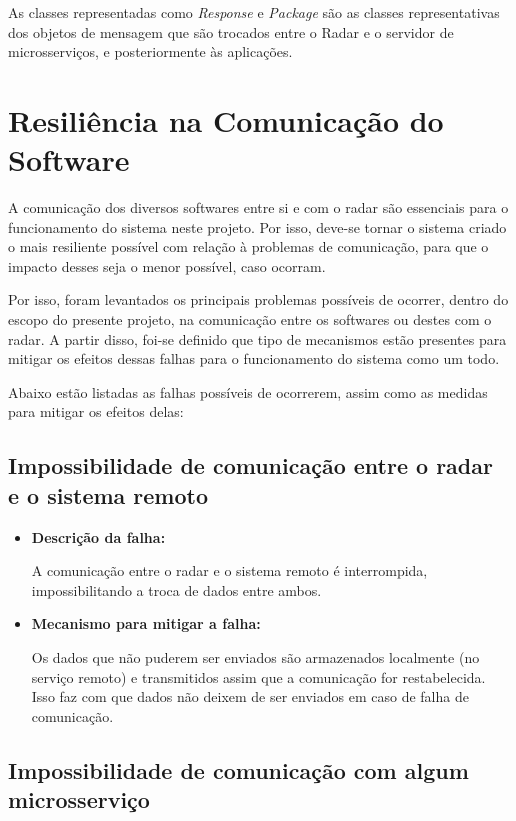 As classes representadas como \textit{Response} e \textit{Package} são as classes representativas dos objetos de mensagem que são trocados entre o Radar e o servidor de microsserviços, e posteriormente às aplicações.

\section{Resiliência na Comunicação do Software}

A comunicação dos diversos softwares entre si e com o radar são essenciais para o funcionamento do sistema neste projeto. Por isso, deve-se tornar o sistema criado o mais resiliente possível com relação à problemas de comunicação, para que o impacto desses seja o menor possível, caso ocorram.

Por isso, foram levantados os principais problemas possíveis de ocorrer, dentro do escopo do presente projeto, na comunicação entre os softwares ou destes com o radar. A partir disso, foi-se definido que tipo de mecanismos estão presentes para mitigar os efeitos dessas falhas para o funcionamento do sistema como um todo.

Abaixo estão listadas as falhas possíveis de ocorrerem, assim como as medidas para mitigar os efeitos delas:

\subsection{Impossibilidade de comunicação entre o radar e o sistema remoto}

\begin{itemize}
    \item \textbf{Descrição da falha:}

    A comunicação entre o radar e o sistema remoto é interrompida, impossibilitando a troca de dados entre ambos.

    \item \textbf{Mecanismo para mitigar a falha:}

    Os dados que não puderem ser enviados são armazenados localmente (no serviço remoto) e transmitidos assim que a comunicação for restabelecida. Isso faz com que dados não deixem de ser enviados em caso de falha de comunicação.
\end{itemize}

\subsection{Impossibilidade de comunicação com algum microsserviço}

